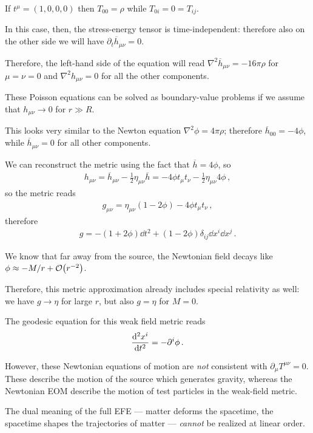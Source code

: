 \documentclass[main.tex]{subfiles}
\begin{document}
If \(t^{\mu } = (1, 0, 0, 0)\) then \(T_{00} = \rho \) while \(T_{0i} = 0 = T_{ij}\). 

In this case, then, the stress-energy tensor is time-independent: therefore also on the other side we will have \(\partial_{t} \overline{h}_{\mu \nu } = 0\).

Therefore, the left-hand side of the equation will read \(\nabla^2 \overline{h}_{\mu \nu } = - 16 \pi \rho  \) for \(\mu = \nu = 0\) and \(\nabla^2 h_{\mu \nu } = 0\) for all the other components. 

These Poisson equations can be solved as boundary-value problems if we assume that \(h_{\mu \nu } \to 0 \) for \(r \gg R\). 

This looks very similar to the Newton equation \(\nabla^2 \phi = 4 \pi \rho\); therefore \(\overline{h}_{00} = - 4 \phi \), while \(\overline{h}_{\mu \nu } = 0\) for all other components. 

We can reconstruct the metric using the fact that \(\overline{h} = 4 \phi   \), so 
%
\begin{align}
h_{\mu \nu } = \overline{h}_{\mu \nu } - \frac{1}{2} \eta_{\mu \nu } \overline{h} = - 4 \phi t_\mu t_\nu - \frac{1}{2} \eta_{\mu \nu } 4 \phi 
\,,
\end{align}
%
so the metric reads 
%
\begin{align}
g_{\mu \nu } = \eta_{\mu \nu } (1 - 2 \phi ) - 4 \phi t_\mu t_\nu 
\,,
\end{align}
%
therefore 
%
\begin{align}
g =  - (1 + 2 \phi ) \dd{t^2} + ( 1 - 2 \phi ) \delta_{ij} \dd{x^{i}} \dd{x^{j}}
\,.
\end{align}

We know that far away from the source, the Newtonian field decays like \(\phi \approx - M / r + \order{r^{-2}}\). 

Therefore, this metric approximation already includes special relativity as well: we have \(g \to \eta \) for large \(r\), but also \(g = \eta \) for \(M = 0\). 

The geodesic equation for this weak field metric reads 
%
\begin{align}
\dv[2]{x^{i}}{t} = - \partial^{i}\phi 
\,.
\end{align}

However, these Newtonian equations of motion are 
\emph{not} consistent with \(\partial_{\mu } T^{\mu \nu } = 0\). 
These describe the motion of the source which generates gravity, 
whereas the Newtonian EOM describe the motion of test particles in the weak-field metric. 

The dual meaning of the full EFE --- matter deforms the spacetime, the spacetime shapes the trajectories of matter --- \emph{cannot} be realized at linear order. 
\end{document}
